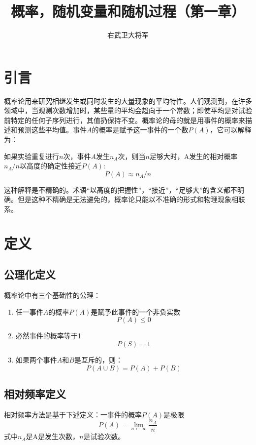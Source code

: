 \documentclass{ctexart}
\author{右武卫大将军}
\title{概率，随机变量和随机过程（第一章）}
\begin{document}
    \maketitle
    \section{引言}
        概率论用来研究相继发生或同时发生的大量现象的平均特性。人们观测到，在许多领域中，当观测次数增加时，某些量的平均会趋向于一个常数；即使平均是对试验前特定的任何子序列进行，其值扔保持不变。概率论的母的就是用事件的概率来描述和预测这些平均值。事件$A$的概率是赋予这一事件的一个数$P(A)$，它可以解释为：
        
            如果实验重复进行$n$次，事件$A$发生$n_A$次，则当$n$足够大时，A发生的相对概率$n_A/n$以高度的确定性接近$P(A)$:
            \begin{equation}
                P(A) \approx n_A/n
                \label{f1-1}
            \end{equation}
            
        这种解释是不精确的。术语“以高度的把握性”，“接近”，“足够大”的含义都不明确。但是这种不精确是无法避免的，概率论只能以不准确的形式和物理现象相联系。
    \section{定义}
        \subsection{公理化定义}
            概率论中有三个基础性的公理：
            \begin{enumerate}
                \item 任一事件$A$的概率$P(A)$是赋予此事件的一个非负实数
                        $$P(A) \le 0$$
                \item 必然事件的概率等于1
                        $$P(S)=1$$
                \item 如果两个事件$A$和$B$是互斥的，则：
                        $$P(A\cup B) = P(A) + P(B)$$
            \end{enumerate}
        \subsection{相对频率定义}
            相对频率方法是基于下述定义：一事件的概率$P(A)$是极限
                \begin{equation}
                    P(A) = \lim_{n\leftarrow \infty} \frac{n_A}{n}
                    \label{f1-6}
                \end{equation}
            式中$n_A$是A是发生次数，$n$是试验次数。
                
\end{document}
